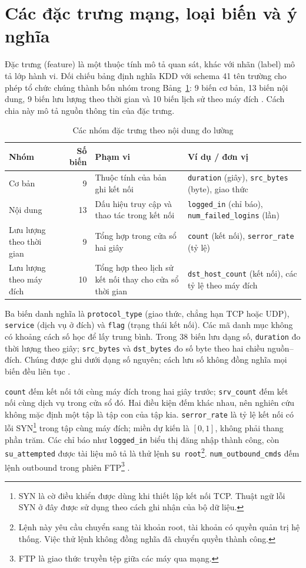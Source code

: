 \section{Các đặc trưng mạng, loại biến và ý nghĩa}
Đặc trưng (feature) là một thuộc tính mô tả quan sát, khác với nhãn (label) mô tả lớp hành vi. Đối chiếu bảng định nghĩa KDD với schema 41 tên trường cho phép tổ chức chúng thành bốn nhóm trong Bảng~\ref{tab:chuong2:features}: 9 biến cơ bản, 13 biến nội dung, 9 biến lưu lượng theo thời gian và 10 biến lịch sử theo máy đích \cite{task2_kdd1999,chuong2_schema1999}. Cách chia này mô tả nguồn thông tin của đặc trưng.
\begin{table}[H]\centering
\caption{Các nhóm đặc trưng theo nội dung đo lường}
\label{tab:chuong2:features}
\small\setlength{\tabcolsep}{4pt}
\begin{tabular}{>{\raggedright\arraybackslash}p{3cm}r>{\raggedright\arraybackslash}p{4.5cm}>{\raggedright\arraybackslash}p{5.2cm}}\toprule
Nhóm & Số biến & Phạm vi & Ví dụ / đơn vị\\\midrule
Cơ bản & 9 & Thuộc tính của bản ghi kết nối & \texttt{duration} (giây), \texttt{src\_bytes} (byte), giao thức\\
Nội dung & 13 & Dấu hiệu truy cập và thao tác trong kết nối & \texttt{logged\_in} (chỉ báo), \texttt{num\_failed\_logins} (lần)\\
Lưu lượng theo thời gian & 9 & Tổng hợp trong cửa sổ hai giây & \texttt{count} (kết nối), \texttt{serror\_rate} (tỷ lệ)\\
Lưu lượng theo máy đích & 10 & Tổng hợp theo lịch sử kết nối thay cho cửa sổ thời gian & \texttt{dst\_host\_count} (kết nối), các tỷ lệ theo máy đích\\
\bottomrule\end{tabular}\end{table}
Ba biến danh nghĩa là \texttt{protocol\_type} (giao thức, chẳng hạn TCP hoặc UDP), \texttt{service} (dịch vụ ở đích) và \texttt{flag} (trạng thái kết nối). Các mã danh mục không có khoảng cách số học để lấy trung bình. Trong 38 biến lưu dạng số, \texttt{duration} đo thời lượng theo giây; \texttt{src\_bytes} và \texttt{dst\_bytes} đo số byte theo hai chiều nguồn--đích. Chúng được ghi dưới dạng số nguyên; cách lưu số không đồng nghĩa mọi biến đều liên tục \cite{task2_kdd1999,chuong2_schema1999}.

\texttt{count} đếm kết nối tới cùng máy đích trong hai giây trước; \texttt{srv\_count} đếm kết nối cùng dịch vụ trong cửa sổ đó. Hai điều kiện đếm khác nhau, nên nghiên cứu không mặc định một tập là tập con của tập kia. \texttt{serror\_rate} là tỷ lệ kết nối có lỗi SYN\footnote{SYN là cờ điều khiển được dùng khi thiết lập kết nối TCP. Thuật ngữ lỗi SYN ở đây được sử dụng theo cách ghi nhận của bộ dữ liệu.} trong tập cùng máy đích; miền dự kiến là $[0,1]$, không phải thang phần trăm. Các chỉ báo như \texttt{logged\_in} biểu thị đăng nhập thành công, còn \texttt{su\_attempted} được tài liệu mô tả là thử lệnh \texttt{su root}\footnote{Lệnh này yêu cầu chuyển sang tài khoản root, tài khoản có quyền quản trị hệ thống. Việc thử lệnh không đồng nghĩa đã chuyển quyền thành công.}. \texttt{num\_outbound\_cmds} đếm lệnh outbound trong phiên FTP\footnote{FTP là giao thức truyền tệp giữa các máy qua mạng.} \cite{task2_kdd1999}.

